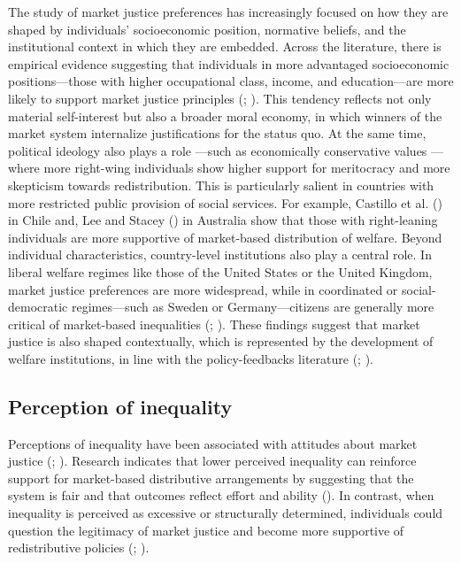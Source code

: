 \documentclass[
  12pt,
]{article}
\begin{document}
The study of market justice preferences has increasingly focused on how
they are shaped by individuals' socioeconomic position, normative
beliefs, and the institutional context in which they are embedded.
Across the literature, there is empirical evidence suggesting that
individuals in more advantaged socioeconomic positions---those with
higher occupational class, income, and education---are more likely to
support market justice principles (; ). This tendency reflects not only material self-interest but also
a broader moral economy, in which winners of the market system
internalize justifications for the status quo. At the same time,
political ideology also plays a role ---such as economically
conservative values --- where more right-wing individuals show higher
support for meritocracy and more skepticism towards redistribution. This
is particularly salient in countries with more restricted public
provision of social services. For example, Castillo et al.
() in Chile and, Lee and
Stacey () in Australia show that
those with right-leaning individuals are more supportive of market-based
distribution of welfare. Beyond individual characteristics,
country-level institutions also play a central role. In liberal welfare
regimes like those of the United States or the United Kingdom, market
justice preferences are more widespread, while in coordinated or
social-democratic regimes---such as Sweden or Germany---citizens are
generally more critical of market-based inequalities
(;
). These findings suggest
that market justice is also shaped contextually, which is represented by
the development of welfare institutions, in line with the
policy-feedbacks literature
(;
).

\subsection{Perception of inequality}\label{perception-of-inequality}

Perceptions of inequality have been associated with attitudes about
market justice (; ). Research
indicates that lower perceived inequality can reinforce support for
market-based distributive arrangements by suggesting that the system is
fair and that outcomes reflect effort and ability
(). In contrast, when inequality
is perceived as excessive or structurally determined, individuals could
question the legitimacy of market justice and become more supportive of
redistributive policies
(;
).
\end{document}
